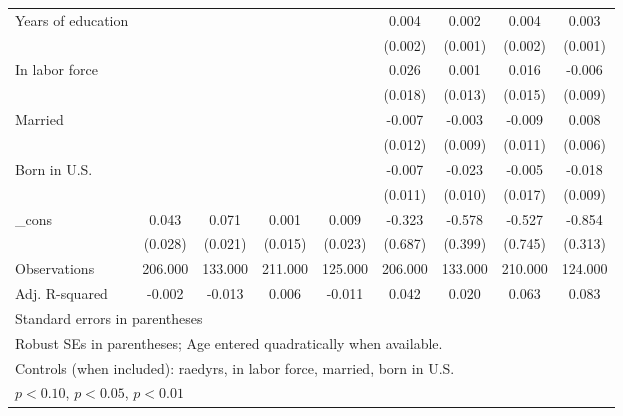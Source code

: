 \begin{table}[htbp]
\begin{tabular}{l*{8}{c}}
Years of education&                  &                  &                  &                  &    0.004         &    0.002         &    0.004\sym{**} &    0.003\sym{**} \\
          &                  &                  &                  &                  &  (0.002)         &  (0.001)         &  (0.002)         &  (0.001)         \\
In labor force&                  &                  &                  &                  &    0.026         &    0.001         &    0.016         &   -0.006         \\
          &                  &                  &                  &                  &  (0.018)         &  (0.013)         &  (0.015)         &  (0.009)         \\
Married   &                  &                  &                  &                  &   -0.007         &   -0.003         &   -0.009         &    0.008         \\
          &                  &                  &                  &                  &  (0.012)         &  (0.009)         &  (0.011)         &  (0.006)         \\
Born in U.S.&                  &                  &                  &                  &   -0.007         &   -0.023\sym{**} &   -0.005         &   -0.018\sym{*}  \\
          &                  &                  &                  &                  &  (0.011)         &  (0.010)         &  (0.017)         &  (0.009)         \\
\_cons    &    0.043         &    0.071\sym{***}&    0.001         &    0.009         &   -0.323         &   -0.578         &   -0.527         &   -0.854\sym{***}\\
          &  (0.028)         &  (0.021)         &  (0.015)         &  (0.023)         &  (0.687)         &  (0.399)         &  (0.745)         &  (0.313)         \\
\midrule
Observations&  206.000         &  133.000         &  211.000         &  125.000         &  206.000         &  133.000         &  210.000         &  124.000         \\
Adj. R-squared&   -0.002         &   -0.013         &    0.006         &   -0.011         &    0.042         &    0.020         &    0.063         &    0.083         \\
\bottomrule
\multicolumn{9}{l}{\footnotesize Standard errors in parentheses}\\
\multicolumn{9}{l}{\footnotesize Robust SEs in parentheses; Age entered quadratically when available.}\\
\multicolumn{9}{l}{\footnotesize Controls (when included): raedyrs, in labor force, married, born in U.S.}\\
\multicolumn{9}{l}{\footnotesize \sym{*} \(p<0.10\), \sym{**} \(p<0.05\), \sym{***} \(p<0.01\)}\\
\end{tabular}
\end{table}
